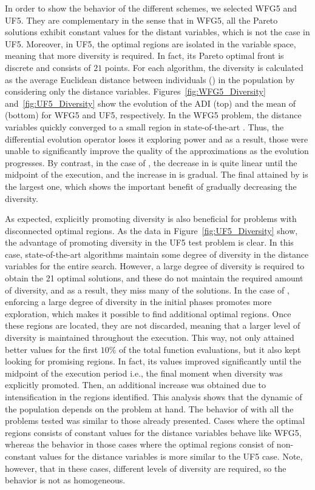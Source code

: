 In order to show the behavior of the different schemes, we selected WFG5 and UF5.
%
They are complementary in the sense that in WFG5, all the Pareto solutions exhibit constant 
values for the distant variables, which is not the case in UF5.
%
Moreover, in UF5, the optimal regions are isolated in the variable 
space, meaning that more diversity is required.
%
In fact, its Pareto optimal front is discrete and consists of $21$ points.
%
For each algorithm, the diversity is calculated as the average Euclidean distance between individuals (\ADI{}) in the population 
by considering only the distance variables.
%
Figures~\ref{fig:WFG5_Diversity} and~\ref{fig:UF5_Diversity} show the evolution of the ADI (top) and the mean of \HV{} (bottom) 
for WFG5 and UF5, respectively.
%
In the WFG5 problem, the distance variables quickly converged to a small region 
in state-of-the-art \MOEAS{}.
%
Thus, the differential evolution operator loses it exploring power and as a result,
those \MOEAS{} were unable to significantly improve the quality of the approximations as the
evolution progresses.
%
By contrast, in the case of \AVSDMOEAD{}, the decrease in \ADI{} is quite linear until the midpoint of the execution, and
the increase in \HV{} is gradual.
%
The final \HV{} attained by \AVSDMOEAD{} is the largest one, which shows the important benefit
of gradually decreasing the diversity.

As expected, explicitly promoting diversity is also beneficial for problems with disconnected optimal regions.
%
As the data in Figure~\ref{fig:UF5_Diversity} show, the advantage of promoting diversity in the UF5 test 
problem is clear.
%
In this case, state-of-the-art algorithms maintain some degree of diversity in the distance variables for
the entire search.
%
However, a large degree of diversity is required to obtain the 21 optimal solutions, and these \MOEAS{} do not maintain
the required amount of diversity, and as a result, they miss many of the solutions.
%
In the case of \AVSDMOEAD{}, enforcing a large degree of diversity in the initial phases promotes more exploration, 
which makes it possible to find additional optimal regions.
%
Once these regions are located, they are not discarded, meaning that a larger level of diversity is maintained throughout the
execution.
%
This way, \AVSDMOEAD{} not only attained better \HV{} values for the first $10\%$ of the total function evaluations, but 
it also kept looking for promising regions.
%
In fact, its \HV{} values improved significantly until the midpoint of the execution period i.e., the final moment
when diversity was explicitly promoted.
%
Then, an additional increase was obtained due to intensification in the regions identified.
%
This analysis shows that the dynamic of the population depends on the problem at hand.
%
The behavior of \AVSDMOEAD{} with all the problems tested
was similar to those already presented.
%
Cases where the optimal regions consists of constant values for the distance variables behave like WFG5, whereas
the behavior in those cases where the optimal regions consist of non-constant values for the distance variables is
more similar to the UF5 case.
%
Note, however, that in these cases, different levels of diversity are required, so the behavior is not as homogeneous.

